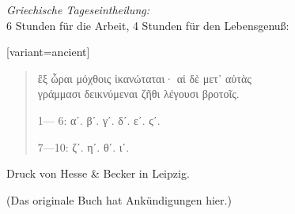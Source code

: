 \noindent \begin{center}
\emph{Griechische Tages\textcompwordmark{}eintheilung:}\\
6 Stunden für die Arbeit, 4 Stunden für den Lebens\textcompwordmark{}genuß:
\par\end{center}
\begin{greek}[variant=ancient]%
\begin{quote}
ἓξ ὧραι μόχθοις ἱκανώταται· αἱ δὲ μετ᾽ αὐτὰς\\
γράμμασι δεικνύμεναι ζῆθι λέγουσι βροτοῖς.

1— 6: αʹ. βʹ. γʹ. δʹ. εʹ. ϛʹ.

7—10: ζʹ. ηʹ. θʹ. ιʹ. 

\end{quote}
\end{greek}%


\noindent \begin{center}
Druck von Hesse \& Becker in Leipzig.
\par\end{center}

\pagebreak{}

\begin{center}
{\Huge{}(Das originale Buch hat Ankündigungen hier.)}\\

\par\end{center}{\Huge \par}

